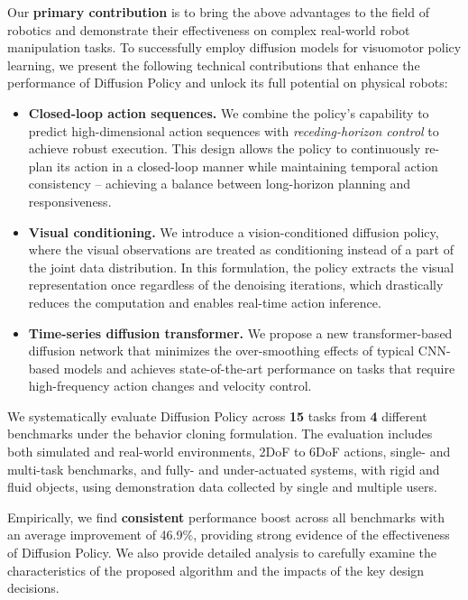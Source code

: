 Our \textbf{primary contribution} is to bring the above advantages to the field of robotics and demonstrate their effectiveness on complex real-world robot manipulation tasks. To successfully employ diffusion models for visuomotor policy learning, we present the following technical contributions that enhance the performance of Diffusion Policy and unlock its full potential on physical robots:
\begin{itemize} %
    \item \textbf{Closed-loop action sequences.} We combine the policy's capability to predict high-dimensional action sequences with \textit{receding-horizon control} to achieve robust execution. This design allows the policy to continuously re-plan its action in a closed-loop manner while maintaining temporal action consistency -- achieving a balance between long-horizon planning and responsiveness.


    \item \textbf{Visual conditioning.} We introduce a vision-conditioned diffusion policy, where the visual observations are treated as conditioning instead of a part of the joint data distribution.  In this formulation, the policy extracts the visual representation once regardless of the denoising iterations, which drastically reduces the computation and enables real-time action inference.


    \item \textbf{Time-series diffusion transformer.} We propose a new transformer-based diffusion network  that minimizes the over-smoothing effects of typical CNN-based models and achieves state-of-the-art performance on tasks that require high-frequency action changes and velocity control.
\end{itemize}

We systematically evaluate Diffusion Policy across \textbf{15} tasks from \textbf{4} different benchmarks \cite{ibc, gupta2019relay, robomimic, bet} under the behavior cloning formulation. The evaluation includes both simulated and real-world environments, 2DoF to 6DoF actions, single- and multi-task benchmarks, and fully- and under-actuated systems, with rigid and fluid objects, using demonstration data collected by single and multiple users.

Empirically, we find \textbf{consistent} performance boost across all benchmarks with an average improvement of 46.9\%, providing strong evidence of the effectiveness of Diffusion Policy. We also provide detailed analysis to carefully examine the characteristics of the proposed algorithm and the impacts of the key design decisions.


